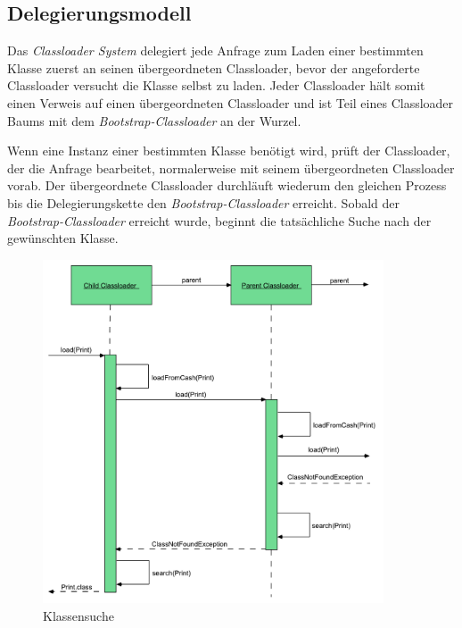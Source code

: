   \subsection{Delegierungsmodell} \label{sec:dm}
    
    Das \textit{Classloader System} delegiert jede Anfrage zum Laden einer bestimmten Klasse zuerst an seinen übergeordneten Classloader, bevor der angeforderte Classloader versucht die Klasse selbst zu laden. Jeder Classloader hält somit einen Verweis auf einen übergeordneten Classloader und ist Teil eines Classloader Baums mit dem \textit{Bootstrap-Classloader} an der Wurzel. 

    Wenn eine Instanz einer bestimmten Klasse benötigt wird, prüft der Classloader, der die Anfrage bearbeitet, normalerweise mit seinem übergeordneten Classloader vorab. Der übergeordnete Classloader durchläuft wiederum den gleichen Prozess bis die Delegierungskette den \textit{Bootstrap-Classloader} erreicht. Sobald der \textit{Bootstrap-Classloader} erreicht wurde, beginnt die tatsächliche Suche nach der gewünschten Klasse.

    \begin{figure}[h]
      \centering
      \includegraphics[width=0.9\textwidth]{material/images/flussCL.pdf}
      \caption{Klassensuche \cite{Forman04javareflection}}
      \label{fig:deligation}
    \end{figure}

